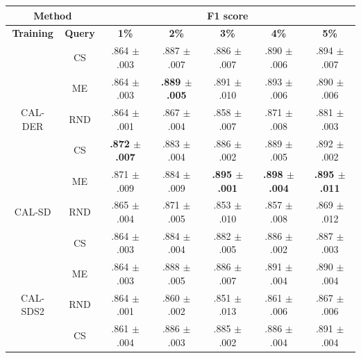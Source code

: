 \begin{table}[htbp]
\centering

\begin{tabular*}{\linewidth}{c|c|@{\extracolsep{\fill}}ccccc}
\toprule
\multicolumn{2}{c|}{\textbf{Method}} & \multicolumn{5}{c}{\textbf{F1 score}} \\
\midrule
\textbf{Training} & \textbf{Query} & \textbf{1\%} & \textbf{2\%} & \textbf{3\%} & \textbf{4\%} & \textbf{5\%}\\
\midrule
 & CS & .864 $\pm$ {\small .003} & .887 $\pm$ {\small .007} & .886 $\pm$ {\small .007} & .890 $\pm$ {\small .006} & .894 $\pm$ {\small .007}\\

 & ME & .864 $\pm$ {\small .003} & \textbf{.889 $\pm$ {\small .005}} & .891 $\pm$ {\small .010} & .893 $\pm$ {\small .006} & .890 $\pm$ {\small .006}\\

\multirow{-3}{*}{\raggedright\arraybackslash CAL-DER} & RND & .864 $\pm$ {\small .001} & .867 $\pm$ {\small .004} & .858 $\pm$ {\small .007} & .871 $\pm$ {\small .008} & .881 $\pm$ {\small .003}\\
\midrule
 & CS & \textbf{.872 $\pm$ {\small .007}} & .883 $\pm$ {\small .004} & .886 $\pm$ {\small .002} & .889 $\pm$ {\small .005} & .892 $\pm$ {\small .002}\\

 & ME & .871 $\pm$ {\small .009} & .884 $\pm$ {\small .009} & \textbf{.895 $\pm$ {\small .001}} & \textbf{.898 $\pm$ {\small .004}} & \textbf{.895 $\pm$ {\small .011}}\\

\multirow{-3}{*}{\raggedright\arraybackslash CAL-SD} & RND & .865 $\pm$ {\small .004} & .871 $\pm$ {\small .005} & .853 $\pm$ {\small .010} & .857 $\pm$ {\small .008} & .869 $\pm$ {\small .012}\\
\midrule
 & CS & .864 $\pm$ {\small .003} & .884 $\pm$ {\small .004} & .882 $\pm$ {\small .005} & .886 $\pm$ {\small .002} & .887 $\pm$ {\small .003}\\

 & ME & .864 $\pm$ {\small .003} & .888 $\pm$ {\small .005} & .886 $\pm$ {\small .007} & .891 $\pm$ {\small .004} & .890 $\pm$ {\small .004}\\

\multirow{-3}{*}{\raggedright\arraybackslash CAL-SDS2} & RND & .864 $\pm$ {\small .001} & .860 $\pm$ {\small .002} & .851 $\pm$ {\small .013} & .861 $\pm$ {\small .006} & .867 $\pm$ {\small .006}\\
\midrule
 & CS & .861 $\pm$ {\small .004} & .886 $\pm$ {\small .003} & .885 $\pm$ {\small .002} & .886 $\pm$ {\small .004} & .891 $\pm$ {\small .004}\\


\end{tabular*}
\end{table}
